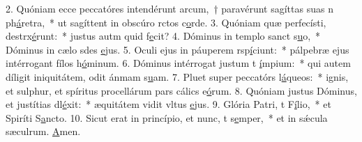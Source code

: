 2. Quóniam ecce peccatóres intendérunt arcum,~† paravérunt sagíttas suas n ph\uline{á}retra,~* ut sagíttent in obscúro rctos c\uline{o}rde.
3. Quóniam quæ perfecísti, destrx\uline{é}runt:~* justus autm quid f\uline{e}cit?
4. Dóminus in templo sanct s\uline{u}o,~* Dóminus in cælo sdes \uline{e}jus.
5. Oculi ejus in páuperem rsp\uline{í}ciunt:~* pálpebræ ejus intérrogant fílos h\uline{ó}minum.
6. Dóminus intérrogat justum t \uline{í}mpium:~* qui autem díligit iniquitátem, odit ánmam s\uline{u}am.
7. Pluet super peccatórs l\uline{á}queos:~* ignis, et sulphur, et spíritus procellárum pars cálics e\uline{ó}rum.
8. Quóniam justus Dóminus, et justítias dl\uline{é}xit:~* æquitátem vidit vltus \uline{e}jus.
9. Glória Patri, t F\uline{í}lio,~* et Spiríti S\uline{a}ncto.
10. Sicut erat in princípio, et nunc, t s\uline{e}mper,~* et in sǽcula sæculrum. \uline{A}men.
